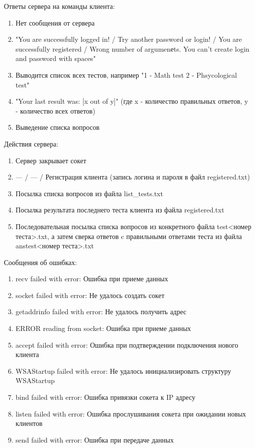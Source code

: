 Ответы сервера на команды клиента:

\begin{enumerate}
\item Нет сообщения от сервера
\item "You are successfully logged in! / Try another password or login! / You are successfully registered / Wrong number of argumenеts. You can't create login and password with spaces"
\item Выводится список всех тестов, например "1 - Math test 2 - Phsycological test"
\item "Your last result was: [x out of y]" (где x - количество правильных ответов, y - количество всех ответов)
\item Выведение списка вопросов
\end{enumerate}

Действия сервера:

\begin{enumerate}
\item Сервер закрывает сокет
\item --- / --- / Регистрация клиента (запись логина и пароля в файл registered.txt)
\item Посылка списка вопросов из файла list\_tests.txt
\item Посылка результата последнего теста клиента из файла registered.txt
\item Последовательная посылка списка вопросов из конкретного файла test<номер теста>.txt, а затем сверка ответов c правильными ответами теста из файла anstest<номер теста>.txt
\end{enumerate}
\vspace{3mm}
Сообщения об ошибках:
\vspace{3mm}
\begin{enumerate}
\item recv failed with error: Ошибка при приеме данных
\item socket failed with error: Не удалось создать сокет
\item getaddrinfo failed with error: Не удалось получить адрес
\item ERROR reading from socket: Ошибка при приеме данных
\item accept failed with error: Ошибка при подтверждении подключения нового клиента
\item WSAStartup failed with error: Не удалось инициализировать структуру WSAStartup
\item bind failed with error: Ошибка привязки сокета к IP адресу
\item listen failed with error: Ошибка прослушивания сокета при ожидании новых клиентов
\item send failed with error: Ошибка при передаче данных
\end{enumerate}

